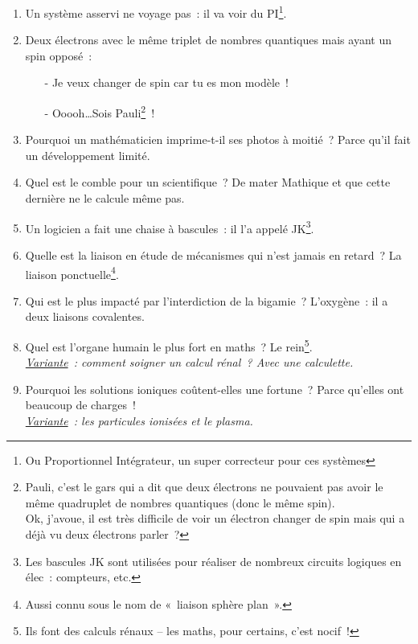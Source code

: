 \documentclass[10pt,a5paper,fullpage]{book}
\begin{document}
\begin{enumerate}
		\item Un système asservi ne voyage pas~: il va voir du PI\footnote{Ou Proportionnel Intégrateur, un super correcteur pour ces systèmes}. 
		\item Deux électrons avec le même triplet de nombres quantiques mais ayant un spin opposé~:
		\begin{itemize}
			\item[-] Je veux changer de spin car tu es mon modèle~!
			\item[-] Ooooh\ldots Sois Pauli\footnote{Pauli, c’est le gars qui a dit que deux électrons ne pouvaient pas avoir le même quadruplet de nombres quantiques (donc le même spin). \\Ok, j’avoue, il est très difficile de voir un électron changer de spin mais qui a déjà vu deux électrons parler~?}~!
		\end{itemize}
		\item Pourquoi un mathématicien imprime-t-il ses photos à moitié~? Parce qu’il fait un développement limité.
		\item Quel est le comble pour un scientifique~? De mater Mathique et que cette dernière ne le calcule même pas.
		\item Un logicien a fait une chaise à bascules~: il l'a appelé JK\footnote{Les bascules JK sont utilisées pour réaliser de nombreux circuits logiques en élec~: compteurs, etc.}.
		\item Quelle est la liaison en étude de mécanismes qui n’est jamais en retard~? La liaison ponctuelle\footnote{Aussi connu sous le nom de « liaison sphère plan ».}.
		\item Qui est le plus impacté par l’interdiction de la bigamie~? L’oxygène~: il a deux liaisons covalentes.
		\item Quel est l’organe humain le plus fort en maths~? Le rein\footnote{Ils font des calculs rénaux -- les maths, pour certains, c’est nocif~!}. \\\textit{\underline{Variante}~: comment soigner un calcul rénal~? Avec une calculette.}
		\item Pourquoi les solutions ioniques coûtent-elles une fortune~? Parce qu’elles ont beaucoup de charges~! \\ \textit{\underline{Variante}~: les particules ionisées et le plasma.}

\end{enumerate}
\end{document}
